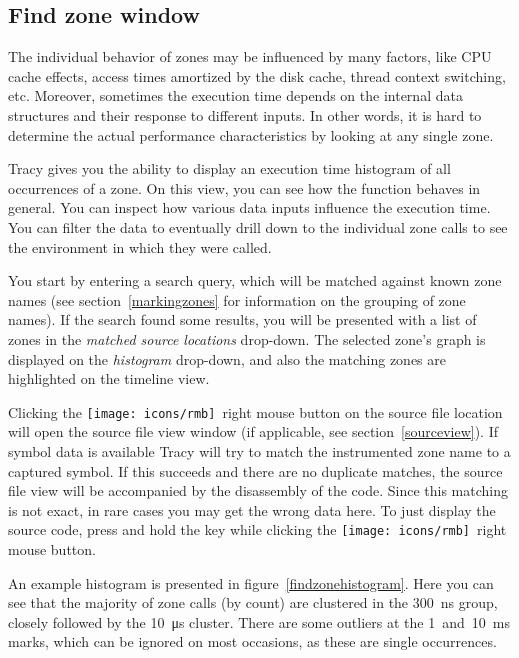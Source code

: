 \documentclass[hidelinks,titlepage,a4paper,twoside]{article}
\newcommand{\RMB}{\texttt{[image: icons/rmb]}}
\begin{document}
\subsection{Find zone window}
\label{findzone}

The individual behavior of zones may be influenced by many factors, like CPU cache effects, access times amortized by the disk cache, thread context switching, etc. Moreover, sometimes the execution time depends on the internal data structures and their response to different inputs. In other words, it is hard to determine the actual performance characteristics by looking at any single zone.

Tracy gives you the ability to display an execution time histogram of all occurrences of a zone. On this view, you can see how the function behaves in general. You can inspect how various data inputs influence the execution time. You can filter the data to eventually drill down to the individual zone calls to see the environment in which they were called.

You start by entering a search query, which will be matched against known zone names (see section~\ref{markingzones} for information on the grouping of zone names). If the search found some results, you will be presented with a list of zones in the \emph{matched source locations} drop-down. The selected zone's graph is displayed on the \emph{histogram} drop-down, and also the matching zones are highlighted on the timeline view.

Clicking the \RMB{}~right mouse button on the source file location will open the source file view window (if applicable, see section~\ref{sourceview}). If symbol data is available Tracy will try to match the instrumented zone name to a captured symbol. If this succeeds and there are no duplicate matches, the source file view will be accompanied by the disassembly of the code. Since this matching is not exact, in rare cases you may get the wrong data here. To just display the source code, press and hold the \keys{\ctrl} key while clicking the \RMB{}~right mouse button.

An example histogram is presented in figure~\ref{findzonehistogram}. Here you can see that the majority of zone calls (by count) are clustered in the 300~\si{\nano\second} group, closely followed by the 10~\si{\micro\second} cluster. There are some outliers at the 1~and~10~\si{\milli\second} marks, which can be ignored on most occasions, as these are single occurrences.
\end{document}
